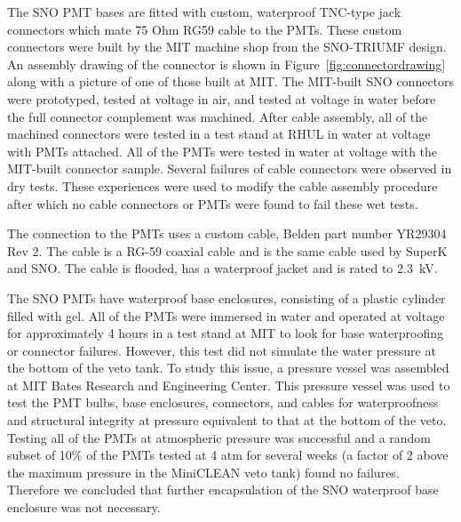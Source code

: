 \documentclass[review,number,sort&compress]{elsarticle}
\begin{document}
The SNO PMT bases are fitted with custom, waterproof TNC-type jack
connectors which mate 75 Ohm RG59 cable to the PMTs. These custom
connectors were built by the MIT machine shop from the SNO-TRIUMF
design. An assembly drawing of the connector is shown in
Figure~\ref{fig:connectordrawing} along with a picture of one of those
built at MIT. The MIT-built SNO
connectors were prototyped, tested at voltage in air, and tested at
voltage in water before the full connector complement was machined.
After cable assembly, all of the machined connectors were tested in
a test stand at RHUL in water at voltage with PMTs attached. All of the
PMTs were tested in water at voltage with the MIT-built connector
sample. Several failures of cable connectors were observed in dry
tests. These experiences were used to modify the cable assembly
procedure after which no cable connectors or PMTs were found to fail
these wet tests.


The connection to the PMTs uses a custom cable, Belden part number YR29304 Rev 2. The cable is a
RG-59 coaxial cable and is the same cable used by SuperK and SNO.
The cable is flooded, has a waterproof jacket and is rated to 2.3~kV.

The SNO PMTs have waterproof base enclosures, consisting of a plastic
cylinder filled with gel. All of the PMTs were immersed in water and
operated at voltage for approximately 4 hours in a test stand at MIT
to look for base waterproofing or connector failures. However, this
test did not simulate the water pressure at the bottom of the veto
tank. To study this issue, a pressure vessel was assembled at MIT
Bates Research and Engineering Center. This pressure vessel was used to test the PMT bulbs, base
enclosures, connectors, and cables for waterproofness and structural
integrity at pressure equivalent to that at the bottom of the veto.
Testing all of the PMTs at atmospheric pressure was successful and a
random subset of 10\% of the PMTs tested at 4 atm for several weeks (a
factor of 2 above the maximum pressure in the MiniCLEAN veto tank)
found no failures. Therefore we concluded that further encapsulation
of the SNO waterproof base enclosure was not necessary.
\end{document}
